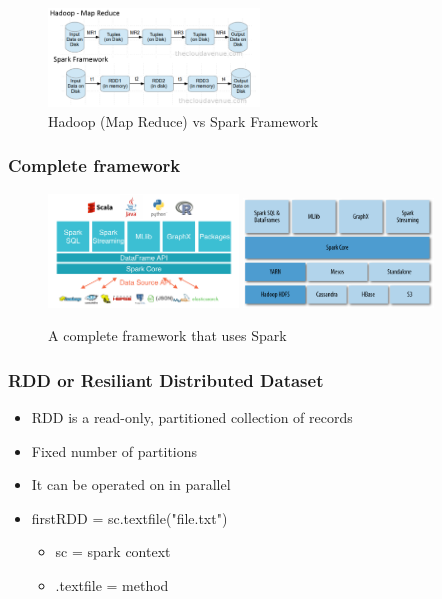 \documentclass{article}
\begin{document}
\begin{figure}[H]
    \centering
    \includegraphics[width=0.5\textwidth]{spark2.png}
    \caption{Hadoop (Map Reduce) vs Spark Framework}
\end{figure}

\subsubsection{Complete framework}

\begin{figure}[H]
    \centering
    \includegraphics[width=0.45\textwidth]{spark-completeframework.png}
    \includegraphics[width=0.45\textwidth]{spark-completeframework2.png}
    \caption{A complete framework that uses Spark}
\end{figure}

\subsubsection{RDD or Resiliant Distributed Dataset}

\begin{itemize}
    \item RDD is a read-only, partitioned collection of records
    \item Fixed number of partitions
    \item It can be operated on in parallel
    \item firstRDD = sc.textfile("file.txt")
    \begin{itemize}
        \item sc = spark context
        \item .textfile = method
    \end{itemize}
\end{itemize}
\end{document}
